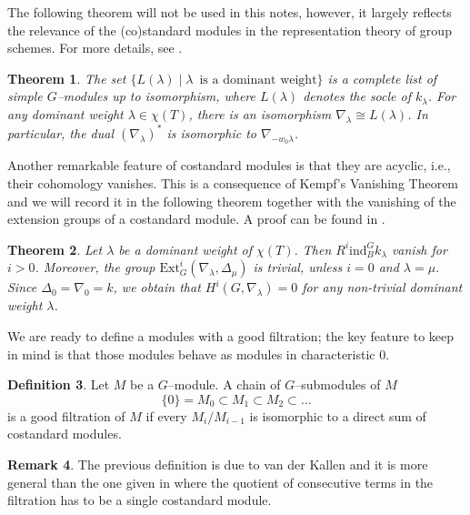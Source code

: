 \documentclass{article}
\theoremstyle{plain}
\newtheorem{Th}{Theorem}[section]
\theoremstyle{definition}
\newtheorem{Def}[Th]{Definition}
\newtheorem{Rem}[Th]{Remark}
\begin{document}
The following theorem will not be used in this notes, however, it largely reflects the relevance of the (co)standard modules in the representation theory of group schemes. For more details, see \cite[Section II.2]{jantzen2003representations}.

\begin{Th}
    The set $\{ L(\lambda) \mid \lambda \, \textrm{ is a dominant weight}\}$ is a complete list of simple $G$--modules up to isomorphism, where $L(\lambda)$ denotes the socle of $k_\lambda$. 
         For any dominant weight $\lambda\in \chi(T)$, there is an isomorphism $\nabla_\lambda\cong L(\lambda)$. In particular, the dual $(\nabla_\lambda)^\ast$ is isomorphic to $\nabla_{-w_0\lambda}$.
\end{Th}


Another remarkable feature of costandard modules is that they are acyclic, i.e., their cohomology vanishes. This is a consequence of Kempf's Vanishing Theorem and we will record it in the following theorem together with the vanishing of the extension groups of a costandard module. A proof can be found in \cite[Section II.4]{jantzen2003representations}.

\begin{Th}\label{Kempf's theorem}
    Let $\lambda$ be a dominant weight of $\chi(T)$. Then $R^i \mathrm{ind}_B^G k_\lambda$ vanish for $i>0$. Moreover, the group $\mathrm{Ext}_G^i(\nabla_\lambda,\Delta_\mu)$ is trivial, unless $i=0$ and $\lambda=\mu$. Since $\Delta_0=\nabla_0=k$, we obtain that $H^i(G,\nabla_\lambda)=0$ for  any non-trivial dominant weight $\lambda$. 
\end{Th}

We are ready to define a modules with a good filtration; the key feature to keep in mind is that those modules behave as modules in characteristic 0. 

\begin{Def}
    Let $M$ be a $G$--module. A chain of $G$--submodules of $M$
\[
\{0\} = M_0 \subset M_1 \subset M_2 \subset \dots
\]
is a good filtration of $M$ if every $ M_{i} / M_{i-1}$ is isomorphic to a direct sum of costandard modules. 
\end{Def}

\begin{Rem}
    The previous definition is due to van der Kallen \cite{vdK5-JB} and it is more general than the one given  in \cite{jantzen2003representations} where the quotient of consecutive terms in the filtration has to be a single costandard module. 
\end{Rem}
\end{document}
